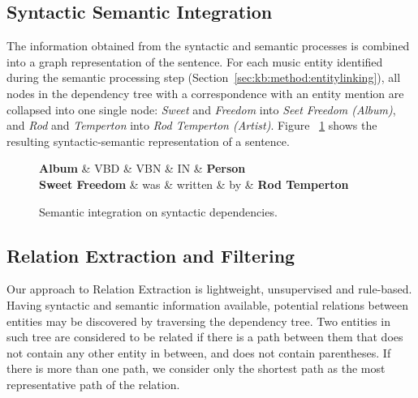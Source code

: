 \subsection{Syntactic Semantic Integration}
\label{sec:kb:method:syntsemint}

The information obtained from the syntactic and semantic processes is combined into a graph representation of the sentence. For each music entity identified during the semantic processing step (Section~\ref{sec:kb:method:entitylinking}), all nodes in the dependency tree with a correspondence with an entity mention are collapsed into one single node: \textit{Sweet} and \textit{Freedom} into \textit{Seet Freedom (Album)}, and \textit{Rod} and \textit{Temperton} into \textit{Rod Temperton (Artist)}. Figure ~\ref{fig:kb:sampletree_combined} shows the resulting syntactic-semantic representation of a sentence.

\begin{figure}[!htb]
\centering
\begin{dependency}
\begin{deptext}[column sep=.0cm]
\textbf{Album} \& VBD \& VBN \& IN \& \textbf{Person} \\
\textbf{Sweet Freedom} \& was \& written \& by \& \textbf{Rod Temperton} \\
\end{deptext}



\end{dependency}
\vspace*{-5mm}
\caption{Semantic integration on syntactic dependencies.}
\label{fig:kb:sampletree_combined}
\end{figure}


\subsection{Relation Extraction and Filtering}
\label{sec:kb:method:re-filtering}

Our approach to Relation Extraction is lightweight, unsupervised and rule-based. Having syntactic and semantic information available, potential relations between entities may be discovered by traversing the dependency tree.
Two entities in such tree are considered to be related if there is a path between them that does not contain any other entity in between, and does not contain parentheses. If there is more than one path, we consider only the shortest path as the most representative path of the relation.

